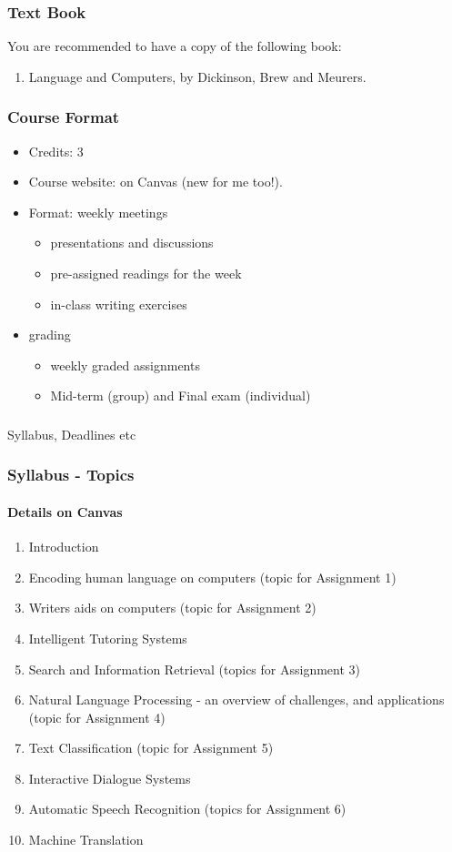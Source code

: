 \documentclass{beamer}
\begin{document}
\begin{frame}
\frametitle{Text Book}
You are recommended to have a copy of the following book: 
\begin{enumerate} 
\item Language and Computers, by Dickinson, Brew and Meurers. 
\end{enumerate}
\end{frame}

\begin{frame}
\frametitle{Course Format}
\begin{itemize}
\item Credits: 3
\item Course website: on Canvas (new for me too!).
\item Format: weekly meetings
 \begin{itemize}
  \item presentations and discussions
  \item pre-assigned readings for the week
  \item in-class writing exercises
 \end{itemize}
 \item grading
  \begin{itemize}
 \item weekly graded assignments
\item Mid-term (group) and Final exam (individual)
\end{itemize}
 \end{itemize}
\end{frame}

\begin{frame}
\frametitle{}
\begin{center}
Syllabus, Deadlines etc 
\end{center}
\end{frame}

\begin{frame}
\frametitle{Syllabus - Topics}
\framesubtitle{Details on Canvas}
\begin{enumerate}
\item Introduction
\item Encoding human language on computers (topic for Assignment 1)
\item Writers aids on computers (topic for Assignment 2)
\item Intelligent Tutoring Systems
\item Search and Information Retrieval (topics for Assignment 3)
\item Natural Language Processing - an overview of challenges, and applications (topic for Assignment 4)
\item Text Classification (topic for Assignment 5)
\item Interactive Dialogue Systems
\item Automatic Speech Recognition (topics for Assignment 6)
\item Machine Translation 
\end{enumerate}
\end{frame}
\end{document}
